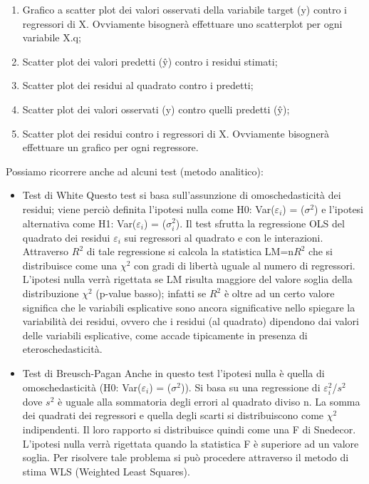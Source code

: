 \documentclass[a4page, 11pt]{article}
\begin{document}
\begin{enumerate}[noitemsep]
\item Grafico a scatter plot dei valori osservati della variabile target (y) contro i regressori di X. Ovviamente bisognerà effettuare uno scatterplot per ogni variabile X.q;
\item Scatter plot dei valori predetti (ŷ) contro i residui stimati;
\item Scatter plot dei residui al quadrato contro i predetti;
\item Scatter plot dei valori osservati (y) contro quelli predetti (ŷ);
\item Scatter plot dei residui contro i regressori di X. Ovviamente bisognerà effettuare un grafico per ogni regressore.
\end{enumerate}
Possiamo ricorrere anche ad alcuni test (metodo analitico):
\begin{itemize}
\item Test di White
Questo test si basa sull’assunzione di omoschedasticità dei residui; viene perciò definita l’ipotesi nulla come H0: Var($\varepsilon_i$) = ($\sigma^2$) e l’ipotesi alternativa come H1: Var($\varepsilon_i$) = ($\sigma^2_i$).
Il test sfrutta la regressione OLS del quadrato dei residui $\varepsilon_i$ sui regressori al quadrato e con le interazioni.
Attraverso $R^{2}$ di tale regressione si calcola la statistica LM=n$R^{2}$ che si distribuisce come una $\chi^{2}$ con gradi di libertà uguale al numero di regressori. L’ipotesi nulla verrà rigettata se LM risulta maggiore del valore soglia della distribuzione $\chi^{2}$ (p-value basso); %
infatti se $R^{2}$ è oltre ad un certo valore significa che le variabili esplicative sono ancora significative nello spiegare la variabilità dei residui, ovvero che i residui (al quadrato) dipendono dai valori delle variabili esplicative, come accade tipicamente in presenza di eteroschedasticità.

\item Test di Breusch-Pagan
Anche in questo test l’ipotesi nulla è quella di omoschedasticità (H0: Var($\varepsilon_i$) = ($\sigma^2$)).
Si basa su una regressione di $\varepsilon^{2}_i$/$s^{2}$ dove $s^{2}$ è uguale alla sommatoria degli errori al quadrato diviso n. La somma dei quadrati dei regressori e quella degli scarti si distribuiscono come $\chi^{2}$ indipendenti. Il loro rapporto si distribuisce quindi come una F di Snedecor. L’ipotesi nulla verrà rigettata quando la statistica F è superiore ad un valore soglia.
\newline
Per risolvere tale problema si può procedere attraverso il metodo di stima WLS (Weighted Least Squares).
\end{itemize}
\end{document}
